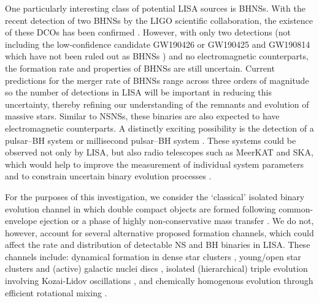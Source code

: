 One particularly interesting class of potential LISA sources is BHNSs. With the recent detection of two BHNSs by the LIGO scientific collaboration, the existence of these DCOs has been confirmed \citep{TheLIGOScientificCollaboration+2021}. However, with only two detections (not including the low-confidence candidate GW190426 \citep{Abbott+2020_GWTC2} or GW190425 and GW190814 which have not been ruled out as BHNSs \citep{Abbott+2020_GW190425,Abbott+2020_GW190814}) and no electromagnetic counterparts, the formation rate and properties of BHNSs are still uncertain. Current predictions for the merger rate of BHNSs range across three orders of magnitude \citep[e.g.][]{Abadie+2010, Broekgaarden+2021} so the number of detections in LISA will be important in reducing this uncertainty, thereby refining our understanding of the remnants and evolution of massive stars. Similar to NSNSs, these binaries are also expected to have electromagnetic counterparts. A distinctly exciting possibility is the detection of a pulsar--BH system or millisecond pulsar--BH system \citep{Narayan+1991}. These systems could be observed not only by LISA, but also radio telescopes such as MeerKAT and SKA, which would help to improve the measurement of individual system parameters and to constrain uncertain binary evolution processes \citep[e.g.][]{Pfahl+2005,Chattopadhyay+2020}.

For the purposes of this investigation, we consider the `classical' isolated binary evolution channel \citep[e.g.][]{Tutukov+1973,Tutukov+1993,Smarr+1976,Srinivasan+1989,Kalogera+2007,Belczynski+2016} in which double compact objects are formed following common-envelope ejection or a phase of highly non-conservative mass transfer \citep{Heuvel+2011, vandenHeuvel+2017}. We do not, however, account for several alternative proposed formation channels, which could affect the rate and distribution of detectable NS and BH binaries in LISA. These channels include: dynamical formation in dense star clusters \citep[e.g.][]{Sigurdsson+1993,PortegiesZwart+2000,Miller+2009,Rodriguez+2015}, young/open star clusters \citep[e.g.][]{Ziosi+2014, DiCarlo+2020, Rastello+2020, Rastello+2021} and (active) galactic nuclei discs \citep[e.g.][]{Morris+1993, Antonini+2016, McKernan+2020}, isolated (hierarchical) triple evolution involving Kozai-Lidov oscillations \citep[e.g.][]{Stephan+2016, Silsbee+2017,Antonini+2017, Toonen+2020},  and chemically homogenous evolution through efficient rotational mixing \citep[e.g.][]{deMink+2009,Mandel+2016,Marchant+2016,Marchant+2017,duBuisson+2020}.

